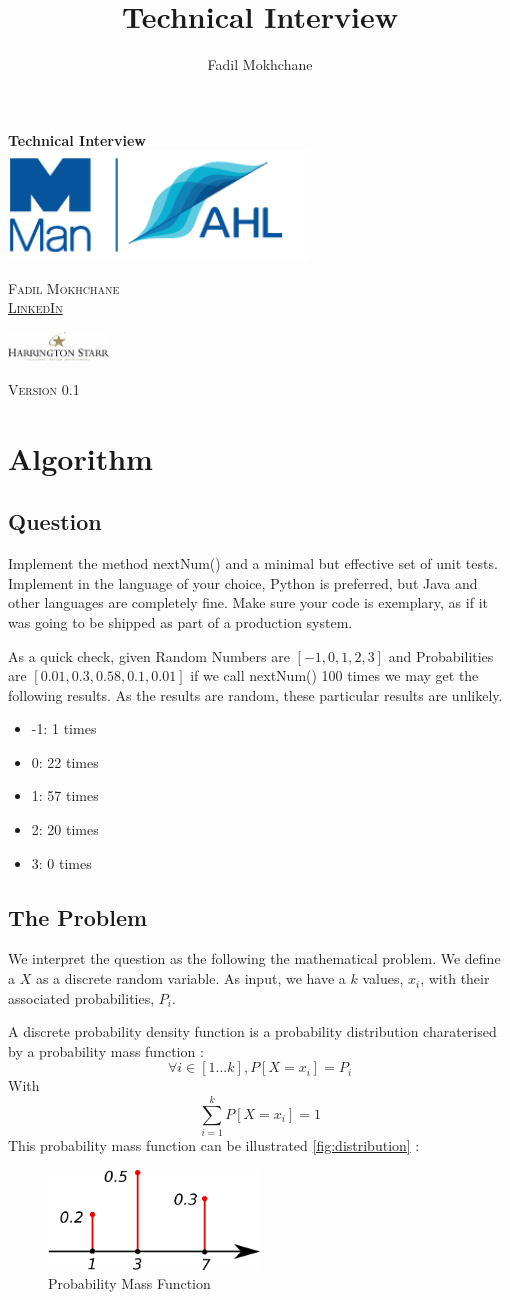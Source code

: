 \documentclass[12pt,a4paper,article]{memoir} %
\title{Technical Interview}
\author{Fadil Mokhchane}
\makeatletter
\newlength\drop
\newcommand*\titleM{\begingroup%
\setlength\drop{0.08\textheight}
\centering
\vspace*{\drop}
{\Huge\bfseries Technical Interview}\\[\baselineskip]
\vfill
\includegraphics[width=0.6\textwidth]{img/logo.png}\par\vspace{1cm}
\vfill
{\Huge\scshape Fadil Mokhchane \\ 
\small \href{https://www.linkedin.com/in/fadil/}{LinkedIn} }\par
\vspace{1cm}
\includegraphics[width=0.2\textwidth]{img/harrington.jpg}\par
\vfill
{\scshape \@date}\par
\vspace*{2\drop}
{\scshape \small Version 0.1}\par
\endgroup}
\makeatother
\begin{document}
\begin{titlingpage}
\titleM
\end{titlingpage}

\newpage
\tableofcontents* %
{}
\listoffigures
\newpage

\chapter{Algorithm}
\section{Question}
Implement the method nextNum() and a minimal but effective set of unit tests. 
Implement in the language of your choice, Python is preferred, but Java and 
other languages are completely fine. 
Make sure your code is exemplary, as if it was going to be shipped as part of a production system.

As a quick check, given Random Numbers are $[-1, 0, 1, 2, 3]$ and 
Probabilities are $[0.01, 0.3, 0.58, 0.1, 0.01]$ if we call nextNum() 100 times 
we may get the following results. As the results are random, these particular results are unlikely.
\begin{itemize}
	\item -1: 1 times 
	\item 0: 22 times
	\item 1: 57 times 
	\item 2: 20 times
	\item 3: 0 times 
\end{itemize}

\section{The Problem}
We interpret the question as the following the mathematical problem. 
We define a $X$ as a discrete random variable. 
As input, we have a $k$ values, $x_i$, with their associated probabilities, $P_i$.

A discrete probability density function is a probability distribution charaterised 
by a probability mass function :
\[
	\forall i \in \left[1 ...  k\right], P\left[ X = x_i \right] = P_i  
\]
With
\[ 
	\sum_{i = 1}^k  P\left[ X = x_i \right]  = 1
\]
This probability mass function can be illustrated \autoref{fig:distribution} :
\begin{figure}[h!]
\begin{center}
\includegraphics[width=0.5\textwidth]{img/distribution.png}
\caption{Probability Mass Function}
\label{fig:distribution}
\end{center}
\end{figure}
\end{document}
